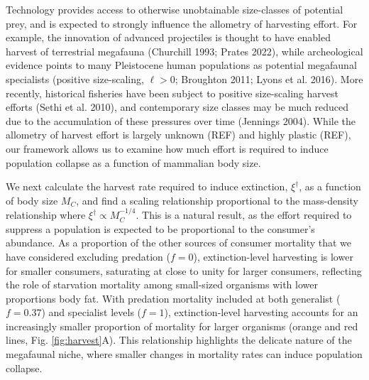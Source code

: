 \documentclass[11pt]{article}
\begin{document}
Technology provides access to otherwise unobtainable size-classes of potential prey, and is expected to strongly influence the allometry of harvesting effort.
For example, the innovation of advanced projectiles is thought to have enabled harvest of terrestrial megafauna (Churchill 1993; Prates 2022), while archeological evidence points to many Pleistocene human populations as potential megafaunal specialists (positive size-scaling, $\ell > 0$; Broughton 2011; Lyons et al. 2016).
More recently, historical fisheries have been subject to positive size-scaling harvest efforts (Sethi et al. 2010), and contemporary size classes may be much reduced due to the accumulation of these pressures over time (Jennings 2004).
While the allometry of harvest effort is largely unknown (REF) and highly plastic (REF), our framework allows us to examine how much effort is required to induce population collapse as a function of mammalian body size. %


We next calculate the harvest rate required to induce extinction, $\xi^\dagger$, as a function of body size $M_C$, and find a scaling relationship proportional to the mass-density relationship where $\xi^\dagger \propto M_C^{-1/4}$.
This is a natural result, as the effort required to suppress a population is expected to be proportional to the consumer's abundance. 
As a proportion of the other sources of consumer mortality that we have considered excluding predation ($f=0$), extinction-level harvesting is lower for smaller consumers, saturating at close to unity for larger consumers, reflecting the role of starvation mortality among small-sized organisms with lower proportions body fat.
With predation mortality included at both generalist ($f = 0.37$) and specialist levels ($f=1$), extinction-level harvesting accounts for an increasingly smaller proportion of mortality for larger organisms (orange and red lines, Fig. \ref{fig:harvest}A).
This relationship highlights the delicate nature of the megafaunal niche, where smaller changes in mortality rates can induce population collapse.
\end{document}
